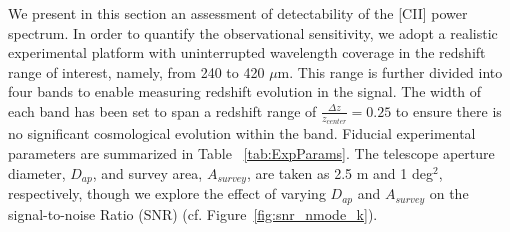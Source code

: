 \documentclass[iop]{emulateapj}
\begin{document}
We present in this section an assessment of detectability of the [CII] power spectrum. In order to quantify the observational sensitivity, we adopt a realistic experimental platform with uninterrupted wavelength coverage in the redshift range of interest, namely, from 240 to 420 $\mu$m. This range is further divided into four bands to enable measuring redshift evolution in the signal. The width of each band has been set to span a redshift range of $\frac{\Delta{z}}{z_{center}} = 0.25$ to ensure there is no significant cosmological evolution within the band. Fiducial experimental parameters are summarized in Table ~\ref{tab:ExpParams}. The telescope aperture diameter, $D_{ap}$, and survey area, $A_{survey}$, are taken as 2.5 m and 1 deg$^2$, respectively, though we explore the effect of varying $D_{ap}$ and $A_{survey}$ on the signal-to-noise Ratio (SNR) (cf. Figure~\ref{fig:snr_nmode_k}).
\end{document}
